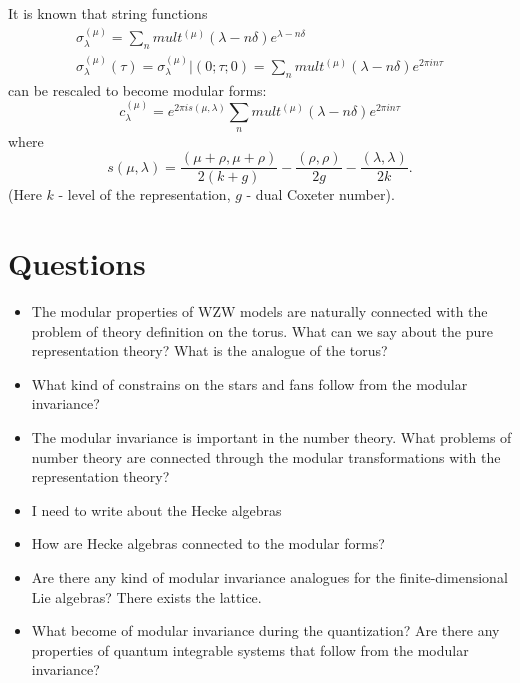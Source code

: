 \documentclass[a4paper,12pt]{article}
\theoremstyle{definition} \newtheorem{Def}{Definition}
\begin{document}
It is known that string functions
\begin{eqnarray}
  \label{eq:9}
  \sigma^{(\mu)}_{\lambda}=\sum_n mult^{(\mu)}(\lambda-n\delta)e^{\lambda-n\delta}\\
  \sigma^{(\mu)}_{\lambda}(\tau)=\sigma^{(\mu)}_{\lambda}|(0;\tau;0)=\sum_n mult^{(\mu)}(\lambda-n\delta)e^{2\pi i n\tau}
\end{eqnarray}
can be rescaled to become modular forms:
\begin{equation}
  \label{eq:10}
  c^{(\mu)}_{\lambda}=e^{2\pi i s(\mu,\lambda)}\sum_n mult^{(\mu)}(\lambda-n\delta)e^{2\pi i n\tau}
\end{equation}
where
\begin{equation}
  \label{eq:11}
  s(\mu,\lambda)=\frac{(\mu+\rho,\mu+\rho)}{2(k+g)}-\frac{(\rho,\rho)}{2g}-\frac{(\lambda,\lambda)}{2k}.
\end{equation}
(Here $k$ - level of the representation, $g$ - dual Coxeter number).

\section{Questions}
\label{sec:questions}
\begin{itemize}
\item The modular properties of WZW models are naturally connected with the problem of theory definition on the torus. What can we say about the pure representation theory? What is the analogue of the torus?
\item What kind of constrains on the stars and fans follow from the modular invariance?
\item The modular invariance is important in the number theory. What problems of number theory are connected through the modular transformations with the representation theory?
\item I need to write about the Hecke algebras
\item How are Hecke algebras connected to the modular forms?
\item Are there any kind of modular invariance analogues for the finite-dimensional Lie algebras? There exists the lattice.
\item What become of modular invariance during the quantization? Are there any properties of quantum integrable systems that follow from the modular invariance?
\end{itemize}

{}

\end{document}

